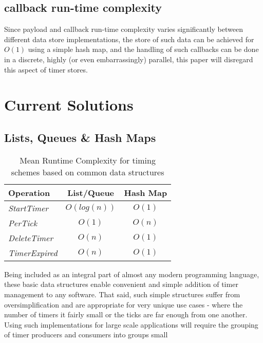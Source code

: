 \documentclass[acmsmall]{acmart} %
\begin{document}
\subsection{callback run-time complexity}

Since payload and callback run-time complexity varies significantly between different data store implementations, the store of such data can be achieved for $ O(1) $ using a simple hash map, and the handling of such callbacks can be done in a discrete, highly (or even embarrassingly) parallel, this paper will disregard this aspect of timer stores.


\section{Current Solutions}

\subsection{Lists, Queues \& Hash Maps}

\begin{table}[h!]
	\begin{center}
		\begin{tabular}{l|c|c}
			\textbf{Operation} & \textbf{List/Queue} & \textbf{Hash Map} \\
			\hline
			\textit{StartTimer} & $O(log(n))$ & $O(1)$ \\
			\textit{PerTick} & $O(1)$ & $O(n)$ \\
			\textit{DeleteTimer} & $O(n)$ & $O(1)$ \\
			\textit{TimerExpired} & $O(n)$ & $O(1)$ \\
		\end{tabular}
		\caption{Mean Runtime Complexity for timing schemes based on common data structures}
	\end{center}
\end{table}

Being included as an integral part of almost any modern programming language, these basic data structures enable convenient and simple addition of timer management to any software. That said, such simple structures suffer from oversimplification and are appropriate for very unique use cases - where the number of timers it fairly small or the ticks are far enough from one another. Using such implementations for large scale applications will require the grouping of timer producers and consumers into groups small 
\end{document}
